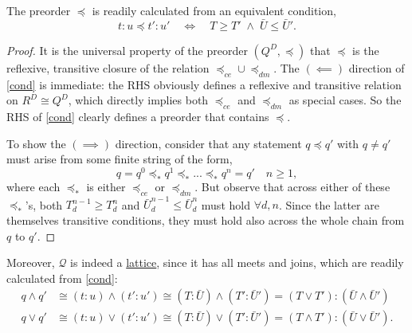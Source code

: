 \documentclass{article}
\newcommand{\Q}{\ensuremath{\mathcal{Q}}}
\begin{document}
\begin{fact}
  The preorder $\preceq$ is readily calculated from an equivalent condition,
  \begin{equation}
  t\!:\!u \preceq t'\!:\!u' \quad\iff\quad T \ge T' \;\wedge\; \bar{U} \le \bar{U}'.\label{cond}
  \end{equation}
\end{fact}
\begin{proof}
  It is the universal property of the preorder $(Q^D, \preceq)$ that $\preceq$ is the reflexive, transitive closure of the relation $\preceq_{ce} \cup \preceq_{dm}$.  The $(\!\impliedby\!)$ direction of \eqref{cond} is immediate: the RHS obviously defines a reflexive and transitive relation on $R^D \cong Q^D$, which directly implies both $\preceq_{ce}$ and $\preceq_{dm}$ as special cases.  So the RHS of \eqref{cond} clearly defines a preorder that contains $\preceq$.

  To show the $(\!\implies\!)$ direction, consider that any statement $q \preceq q'$ with $q \neq q'$ must arise from some finite string of the form,
  \begin{equation}
  q = q^0 \preceq_* q^1 \preceq_* ... \preceq_* q^n = q' \quad n \ge 1, \label{string}
  \end{equation}
  where each $\preceq_*$ is either $\preceq_{ce}$ or $\preceq_{dm}$.  But observe that across either of these $\preceq_*$'s, both $T_d^{n-1} \ge T_d^n$ and $\bar{U}_d^{n-1} \le \bar{U}_d^n$ must hold $\forall d, n$.  Since the latter are themselves transitive conditions, they must hold also across the whole chain from $q$ to $q'$.  
\end{proof}

\begin{corr}\label{lattice}
  Moreover, $\Q$ is indeed a \underline{lattice}, since it has all meets and joins, which are readily calculated from \eqref{cond}:
  \begin{equation}\label{meetjoin}
    \begin{aligned}
    q \wedge q' & \cong (t\!:\!u) \wedge (t'\!:\!u') \cong
    (T\!:\!\bar{U}) \wedge (T'\!:\!\bar{U}') = (T\!\vee\!T'):(\bar{U}\!\wedge\!\bar{U}')
    \\
    q \vee q' & \cong (t\!:\!u) \vee (t'\!:\!u') \cong
    (T\!:\!\bar{U}) \vee (T'\!:\!\bar{U}') = (T\!\wedge\!T'):(\bar{U}\!\vee\!\bar{U}').
    \end{aligned}
  \end{equation}
\end{corr}
\end{document}
